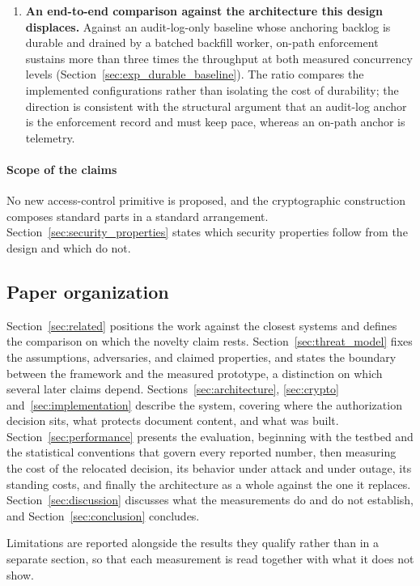 \documentclass[preprint,12pt]{elsarticle}
\begin{document}
\begin{enumerate}
\item \textbf{An end-to-end comparison against the architecture this design
displaces.} Against an audit-log-only baseline whose anchoring backlog is
durable and drained by a batched backfill worker, on-path enforcement
sustains more than three times the throughput at both measured concurrency
levels (Section~\ref{sec:exp_durable_baseline}). The ratio compares the
implemented configurations rather than isolating the cost of durability; the
direction is consistent with the structural argument that an audit-log
anchor is the enforcement record and must keep pace, whereas an on-path
anchor is telemetry.

\end{enumerate}

\paragraph{Scope of the claims}
No new access-control primitive is proposed, and the cryptographic construction
composes standard parts in a standard arrangement.
Section~\ref{sec:security_properties} states which security properties
follow from the design and which do not.


\subsection{Paper organization}
\label{sec:organization}

Section~\ref{sec:related} positions the work against the closest systems and
defines the comparison on which the novelty claim rests.
Section~\ref{sec:threat_model} fixes the assumptions, adversaries, and claimed
properties, and states the boundary between the framework and the measured
prototype, a distinction on which several later claims depend.
Sections~\ref{sec:architecture}, \ref{sec:crypto}
and~\ref{sec:implementation} describe the system, covering where the
authorization decision sits, what protects document content, and what was
built. Section~\ref{sec:performance} presents the evaluation, beginning with
the testbed and the statistical conventions that govern every reported number,
then measuring the cost of the relocated decision, its behavior under attack
and under outage, its standing costs, and finally the architecture as a whole
against the one it replaces. Section~\ref{sec:discussion} discusses what the
measurements do and do not establish, and Section~\ref{sec:conclusion}
concludes.

Limitations are reported alongside the results they qualify rather than in a
separate section, so that each measurement is read together with what it does
not show.
\end{document}
